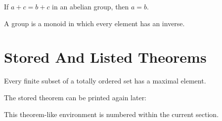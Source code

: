 \documentclass[a4paper,11pt]{article}
\begin{document}
\begin{ftheorem}[Cancellation]
If $a+c=b+c$ in an abelian group, then $a=b$.
\end{ftheorem}

\begin{fdefinition}[Group]
A group is a monoid in which every element has an inverse.
\end{fdefinition}

\section{Stored And Listed Theorems}

\begin{theorem}[store=stored-example,note=Stored theorem]
Every finite subset of a totally ordered set has a maximal element.
\end{theorem}

The stored theorem can be printed again later:


\begin{exampletheorem}[note=Section-local numbering]
This theorem-like environment is numbered within the current section.
\end{exampletheorem}

\listofkeytheorems[title={Theorems in this focused example}]
\end{document}
